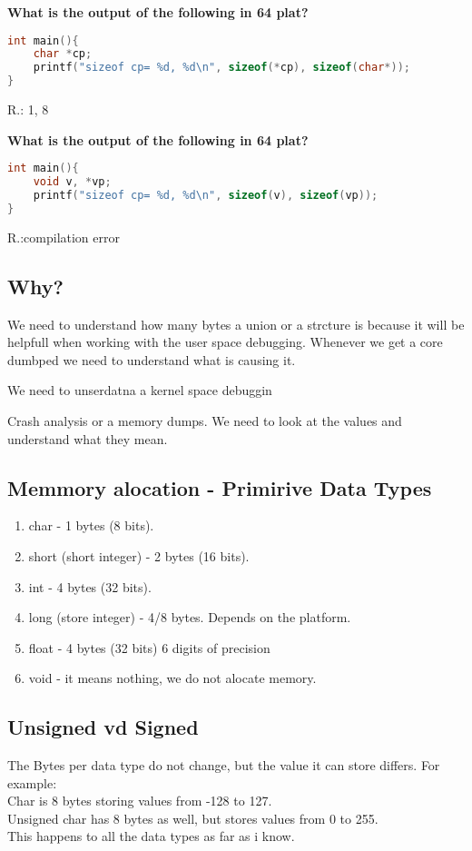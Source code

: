 \documentclass[12pt]{article}
\begin{document}
\textbf{What is the output of the following in 64 plat?}

\begin{lstlisting}[language=C, title=sizeof cenas]
int main(){
	char *cp;
	printf("sizeof cp= %d, %d\n", sizeof(*cp), sizeof(char*));
}
\end{lstlisting}
R.: 1, 8

\textbf{What is the output of the following in 64 plat?}

\begin{lstlisting}[language=C, title=sizeof cenas]
int main(){
	void v, *vp;
	printf("sizeof cp= %d, %d\n", sizeof(v), sizeof(vp));
}
\end{lstlisting}
R.:compilation error

\subsection{Why?}
We need to understand how many bytes a union or a strcture is because it will be helpfull when working with the user space debugging.  Whenever we get a core dumbped we need to understand what is causing it.

We need to unserdatna  a kernel space debuggin

Crash analysis or a memory dumps. We need to look at the values and understand what they mean.

\subsection{Memmory alocation - Primirive Data Types}

\begin{enumerate}
	\item char - 1 bytes (8 bits).

	\item short (short integer) - 2 bytes (16 bits).

	\item int - 4 bytes (32 bits).

	\item long (store integer) - 4/8 bytes. Depends on the platform.

	\item float - 4 bytes (32 bits) 6 digits of precision

	\item void -  it means nothing, we do not alocate memory.
\end{enumerate}

\subsection{Unsigned vd Signed}
The Bytes per data type do not change, but the value it can store differs. For example:\\ Char is 8 bytes storing values from -128 to 127. \\Unsigned char has 8 bytes as well, but stores values from 0 to 255. \\This happens to all the data types as far as i know.
\end{document}
